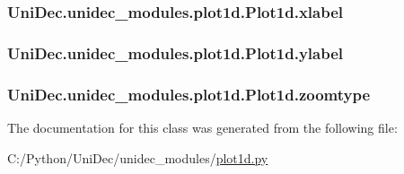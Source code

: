 \subsubsection[{xlabel}]{\setlength{\rightskip}{0pt plus 5cm}Uni\+Dec.\+unidec\+\_\+modules.\+plot1d.\+Plot1d.\+xlabel}\label{class_uni_dec_1_1unidec__modules_1_1plot1d_1_1_plot1d_ab6ee7aa1f3681f697cbe89a77f69418b}
\hypertarget{class_uni_dec_1_1unidec__modules_1_1plot1d_1_1_plot1d_afe92dd02632dfc752ac2e3792ea9b865}{}
\subsubsection[{ylabel}]{\setlength{\rightskip}{0pt plus 5cm}Uni\+Dec.\+unidec\+\_\+modules.\+plot1d.\+Plot1d.\+ylabel}\label{class_uni_dec_1_1unidec__modules_1_1plot1d_1_1_plot1d_afe92dd02632dfc752ac2e3792ea9b865}
\hypertarget{class_uni_dec_1_1unidec__modules_1_1plot1d_1_1_plot1d_aa4c2844a1d7accc0060951a392b46ab7}{}
\subsubsection[{zoomtype}]{\setlength{\rightskip}{0pt plus 5cm}Uni\+Dec.\+unidec\+\_\+modules.\+plot1d.\+Plot1d.\+zoomtype}\label{class_uni_dec_1_1unidec__modules_1_1plot1d_1_1_plot1d_aa4c2844a1d7accc0060951a392b46ab7}


The documentation for this class was generated from the following file\+:\begin{DoxyCompactItemize}
\item 
C\+:/\+Python/\+Uni\+Dec/unidec\+\_\+modules/\hyperlink{plot1d_8py}{plot1d.\+py}\end{DoxyCompactItemize}
